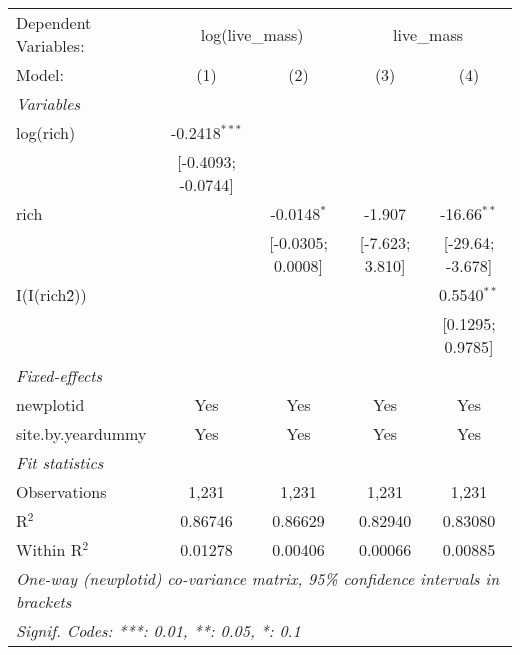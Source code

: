 \begin{tabular}{lcccc}
\tabularnewline\midrule\midrule
Dependent Variables:&\multicolumn{2}{c}{log(live\_mass)}&\multicolumn{2}{c}{live\_mass}\\
Model:&(1) & (2) & (3) & (4)\\
\midrule \emph{Variables}&   &   &   &  \\
log(rich)&-0.2418$^{***}$ &    &    &   \\
  &[-0.4093; -0.0744] &    &    &   \\
rich&   & -0.0148$^{*}$ & -1.907 & -16.66$^{**}$\\
  &   & [-0.0305; 0.0008] & [-7.623; 3.810] & [-29.64; -3.678]\\
I(I(rich\^2))&   &    &    & 0.5540$^{**}$\\
  &   &    &    & [0.1295; 0.9785]\\
\midrule \emph{Fixed-effects}&   &   &   &  \\
newplotid & Yes & Yes & Yes & Yes\\
site.by.yeardummy & Yes & Yes & Yes & Yes\\
\midrule \emph{Fit statistics}&  & & & \\
Observations & 1,231&1,231&1,231&1,231\\
R$^2$ & 0.86746&0.86629&0.82940&0.83080\\
Within R$^2$ & 0.01278&0.00406&0.00066&0.00885\\
\midrule\midrule\multicolumn{5}{l}{\emph{One-way (newplotid) co-variance matrix, 95\% confidence intervals in brackets}}\\
\multicolumn{5}{l}{\emph{Signif. Codes: ***: 0.01, **: 0.05, *: 0.1}}\\
\end{tabular}


